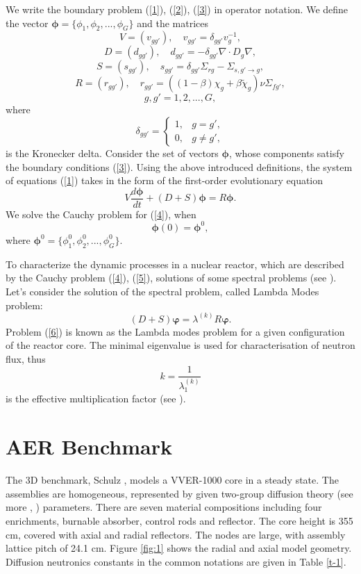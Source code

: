 \documentclass[runningheads,a4paper]{llncs}
\begin{document}
We write the boundary problem (\ref{1}), (\ref{2}), (\ref{3}) in operator notation. 
We define the vector $\bm \phi = \{\phi_1, \phi_2, ..., \phi_G\}$ and the matrices
\[
 V = (v_{g g'}),
 \quad v_{g g'} = \delta_{g g'} v_g^{-1},
\] 
\[
 D = (d_{g g'}),
 \quad d_{g g'} = - \delta_{g g'} \nabla \cdot D_g \nabla,
\] 
\[
 S = (s_{g g'}),
 \quad  s_{g g'} =  \delta_{g g'} \Sigma_{rg} - \Sigma_{s,g'\rightarrow g} ,
\] 
\[
 R = (r_{g g'}),
 \quad  r_{g g'} = ( (1-\beta) \chi_g + \beta \widetilde{\chi}_g) \nu \Sigma_{fg'} ,
\]
\[
g, g' = 1,2, ..., G,
\] 
where
\[
 \delta_{g g'} = \left \{ 
 \begin{matrix}
 1, & g = g', \\
 0, & g \neq  g',
 \end{matrix}
 \right . 
\] 
is the Kronecker delta. Consider the set of vectors $\bm \phi$,  whose components satisfy the boundary conditions
(\ref{3}). Using the above introduced definitions, the system of equations (\ref{1}) takes in the form of the first-order evolutionary equation
\begin{equation}\label{4}
 V \frac{d \bm \phi}{d t} + (D+S) \bm \phi = R \bm \phi .
\end{equation}  
We solve the Cauchy problem for (\ref{4}), when
\begin{equation}\label{5}
 \bm \phi(0) = \bm \phi^0,
\end{equation} 
where $\bm \phi^0 = \{ \phi_1^0,  \phi_2^0, ...,  \phi_G^0 \}$.

To characterize the dynamic processes in a nuclear reactor, which are described by the Cauchy problem (\ref{4}), (\ref{5}), solutions of some spectral problems (see \cite{publicAnnnals2017}). Let's consider the solution of the spectral problem, called Lambda Modes problem:
\begin{equation}\label{6}
 (D+S) \bm \varphi  = \lambda^{(k)} R \bm \varphi .
\end{equation} 
Problem (\ref{6}) is known as the Lambda modes problem for a given configuration of the reactor core.
The minimal eigenvalue is used for characterisation of neutron flux, thus 
\[
 k = \frac{1}{\lambda^{(k)}_1}  
\] 
is the effective multiplication factor (see \cite{stacey2007}).

\section{AER Benchmark}
The 3D benchmark, Schulz \cite{schulz1996}, models a VVER-1000 core in a steady state. The assemblies are homogeneous, represented by given two-group diffusion theory (see more \cite{duderstadt1976nuclear}, \cite{stacey2007}) parameters. There are seven material compositions including four enrichments, burnable absorber, control rods and reflector. The core height is 355 cm, covered with axial and radial reflectors. The nodes are large, with assembly lattice pitch of 24.1 cm. Figure \ref{fig:1} shows the radial and axial model geometry.  Diffusion neutronics constants in the common notations
are given in Table \ref{t-1}. 
\end{document}
